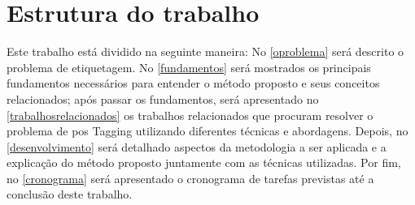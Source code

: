 



\section{Estrutura do trabalho}\label{sec:estruturadotrabalho}

Este trabalho está dividido na seguinte maneira: No \autoref{oproblema} será descrito o problema de etiquetagem. No \autoref{fundamentos} será mostrados os principais fundamentos necessários para entender o método proposto e seus conceitos relacionados; após passar os fundamentos, será apresentado no \autoref{trabalhosrelacionados} os trabalhos relacionados que procuram resolver o problema de \ac{pos} Tagging utilizando diferentes técnicas e abordagens. Depois, no \autoref{desenvolvimento} será detalhado aspectos da metodologia a ser aplicada e a explicação do método proposto juntamente com as técnicas utilizadas. Por fim, no \autoref{cronograma} será apresentado o cronograma de tarefas previstas até a conclusão deste trabalho.
